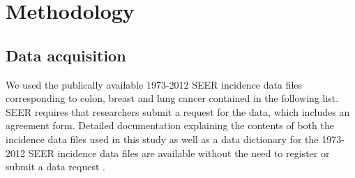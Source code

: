\documentclass[a4paper,11pt]{article}
\begin{document}









\section{Methodology}


\subsection{Data acquisition}

We used the publically available 1973-2012 SEER incidence data files corresponding to colon, breast and lung cancer contained in the following list.
SEER requires that researchers submit a request for the data, which includes an agreement form. Detailed documentation explaining the contents of both the incidence data files used in this study as well as a data dictionary for the 1973-2012 SEER incidence data files are available without the need to register or submit a data request \cite{seerdoc}.
 
\end{document}
